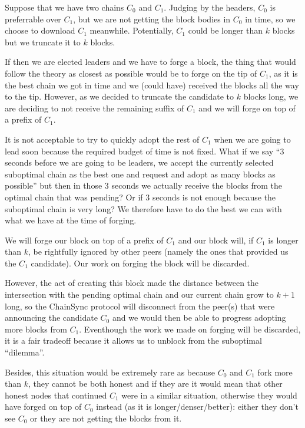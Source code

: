Suppose that we have two chains $C_0$ and $C_1$. Judging by the headers, $C_0$
is preferrable over $C_1$, but we are not getting the block bodies in $C_0$ in
time, so we choose to download $C_1$ meanwhile. Potentially, $C_1$ could be
longer than $k$ blocks but we truncate it to $k$ blocks.

If then we are elected leaders and we have to forge a block, the thing that
would follow the theory as closest as possible would be to forge on the tip of
$C_1$, as it is the best chain we got in time and we (could have) received the
blocks all the way to the tip. However, as we decided to truncate the candidate
to $k$ blocks long, we are deciding to not receive the remaining suffix of $C_1$
and we will forge on top of a prefix of $C_1$.

It is not acceptable to try to quickly adopt the rest of $C_1$ when we are going
to lead soon because the required budget of time is not fixed. What if we say
``3 seconds before we are going to be leaders, we accept the currently selected
suboptimal chain as the best one and request and adopt as many blocks as
possible'' but then in those 3 seconds we actually receive the blocks from the
optimal chain that was pending? Or if 3 seconds is not enough because the
suboptimal chain is very long? We therefore have to do the best we can with what
we have at the time of forging.

We will forge our block on top of a prefix of $C_1$ and our block will, if $C_1$
is longer than $k$, be rightfully ignored by other peers (namely the ones that
provided us the $C_1$ candidate). Our work on forging the block will be
discarded.

However, the act of creating this block made the distance between the
intersection with the pending optimal chain and our current chain grow to $k +
1$ long, so the ChainSync protocol will disconnect from the peer(s) that were
announcing the candidate $C_0$ and we would then be able to progress adopting
more blocks from $C_1$. Eventhough the work we made on forging will be
discarded, it is a fair tradeoff because it allows us to unblock from the
suboptimal ``dilemma''.

Besides, this situation would be extremely rare as because $C_0$ and $C_1$ fork
more than $k$, they cannot be both honest and if they are it would mean that
other honest nodes that continued $C_1$ were in a similar situation, otherwise
they would have forged on top of $C_0$ instead (as it is longer/denser/better):
either they don't see $C_0$ or they are not getting the blocks from it. 

